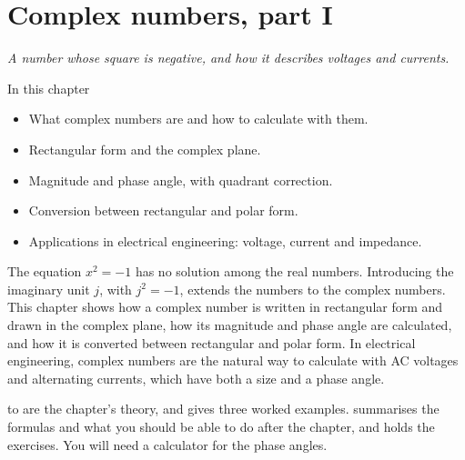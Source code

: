 
\chapter{Complex numbers, part I}
\label{c15:ch}

{\large\itshape A number whose square is negative, and how it describes voltages and currents.\par}

\begin{chapterbox}{In this chapter}
\begin{itemize}
  \item What complex numbers are and how to calculate with them.
  \item Rectangular form and the complex plane.
  \item Magnitude and phase angle, with quadrant correction.
  \item Conversion between rectangular and polar form.
  \item Applications in electrical engineering: voltage, current and impedance.
\end{itemize}
\end{chapterbox}

The equation $x^2 = -1$ has no solution among the real numbers. Introducing the imaginary unit
$j$, with $j^2 = -1$, extends the numbers to the complex numbers. This chapter shows how a complex
number is written in rectangular form and drawn in the complex plane, how its magnitude and phase
angle are calculated, and how it is converted between rectangular and polar form. In electrical
engineering, complex numbers are the natural way to calculate with AC voltages and alternating
currents, which have both a size and a phase angle.

 to  are the chapter's theory, and
 gives three worked examples. 
summarises the formulas and what you should be able to do after the chapter, and
 holds the exercises. You will need a calculator for the phase angles.





